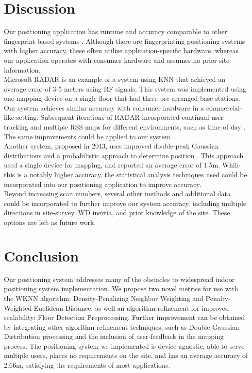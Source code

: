 \documentclass[conference]{IEEEtran}
\begin{document}
\section{Discussion}
\indent Our positioning application has runtime and accuracy comparable to other fingerprint-based systems \cite{Liu}. Although there are fingerprinting positioning systems with higher accuracy, these often utilize application-specific hardware, whereas our application operates with consumer hardware and assumes no prior site information.\\
\indent Microsoft RADAR \cite{Bahl} is an example of a system using KNN that achieved an average error of 3-5 meters using RF signals. This system was implemented using one mapping device on a single floor that had three pre-arranged base stations. Our system achieves similar accuracy with consumer hardware in a commercial-like setting. Subsequent iterations of RADAR incorporated continual user-tracking and multiple RSS maps for different environments, such as time of day \cite{Bahl2}. The same improvements could be applied to our system.\\
\indent Another system, proposed in 2013, uses improved double-peak Gaussian distributions and a probabilistic approach to determine position \cite{Chen}. This approach used a single device for mapping, and reported an average error of 1.5m. While this is a notably higher accuracy, the statistical analysis techniques used could be incorporated into our positioning application to improve accuracy.\\ 
\indent Beyond increasing scan numbers, several other methods and additional data could be incorporated to further improve our system accuracy, including multiple directions in site-survey, WD inertia, and prior knowledge of the site. These options are left as future work.

\section{Conclusion}
Our positioning system addresses many of the obstacles to widespread indoor positioning system implementation. We propose two novel metrics for use with the WKNN algorithm: Density-Penalizing Neighbor Weighting and Penalty-Weighted Euclidean Distance, as well an algorithm refinement for improved scalability: Floor Detection Preprocessing. Further improvement can be obtained by integrating other algorithm refinement techniques, such as Double Gaussian Distribution processing and the inclusion of user-feedback in the mapping process. The positioning system we implemented is device-agnostic, able to serve multiple users, places no requirements on the site, and has an average accuracy of 2.66m, satisfying the requirements of most applications.
\end{document}
